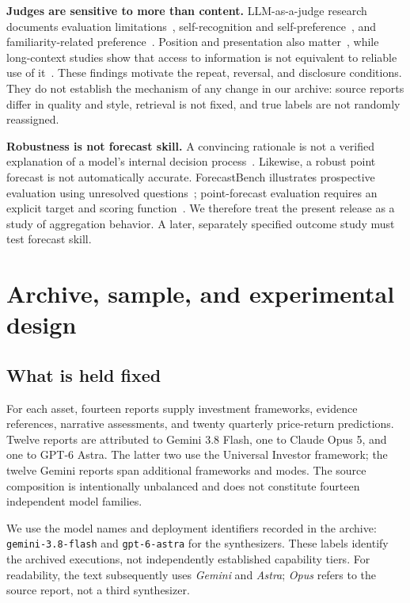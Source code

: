 \documentclass[11pt]{article}
\begin{document}
\textbf{Judges are sensitive to more than content.} LLM-as-a-judge research documents evaluation limitations~\cite{mtbench}, self-recognition and self-preference~\cite{panickssery}, and familiarity-related preference~\cite{wataoka}. Position and presentation also matter~\cite{fair,sclar}, while long-context studies show that access to information is not equivalent to reliable use of it~\cite{lostmiddle}. These findings motivate the repeat, reversal, and disclosure conditions. They do not establish the mechanism of any change in our archive: source reports differ in quality and style, retrieval is not fixed, and true labels are not randomly reassigned.

\textbf{Robustness is not forecast skill.} A convincing rationale is not a verified explanation of a model's internal decision process~\cite{turpin}. Likewise, a robust point forecast is not automatically accurate. ForecastBench illustrates prospective evaluation using unresolved questions~\cite{forecastbench}; point-forecast evaluation requires an explicit target and scoring function~\cite{gneiting}. We therefore treat the present release as a study of aggregation behavior. A later, separately specified outcome study must test forecast skill.

\section{Archive, sample, and experimental design}
\subsection{What is held fixed}
For each asset, fourteen reports supply investment frameworks, evidence references, narrative assessments, and twenty quarterly price-return predictions. Twelve reports are attributed to Gemini 3.8 Flash, one to Claude Opus 5, and one to GPT-6 Astra. The latter two use the Universal Investor framework; the twelve Gemini reports span additional frameworks and modes. The source composition is intentionally unbalanced and does not constitute fourteen independent model families.

We use the model names and deployment identifiers recorded in the archive: \texttt{gemini-3.8-flash} and \texttt{gpt-6-astra} for the synthesizers. These labels identify the archived executions, not independently established capability tiers. For readability, the text subsequently uses \emph{Gemini} and \emph{Astra}; \emph{Opus} refers to the source report, not a third synthesizer.
\end{document}
